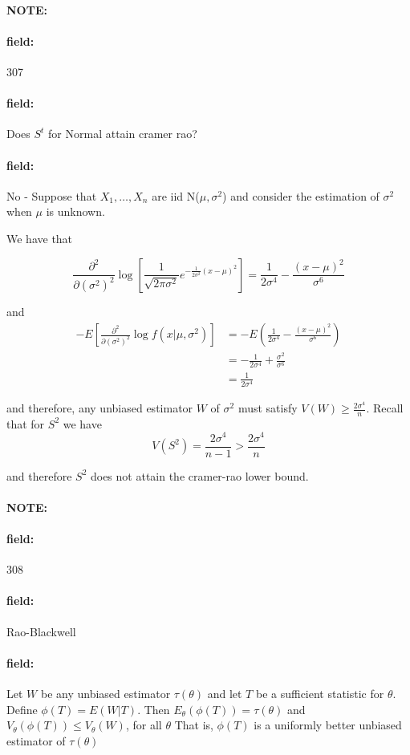 \documentclass[12pt]{article}
\newenvironment{note}{\paragraph{NOTE:}}{}
\newenvironment{field}{\paragraph{field:}}{}
\begin{document}
\begin{note} \begin{field} \tiny 307 \end{field}
  \begin{field}
    Does $S^t$ for Normal attain cramer rao?
  \end{field}
  \begin{field}
    No -
    Suppose that $X_1, \ldots , X_n$ are iid N($\mu,\sigma^2$)
    and consider the estimation of $\sigma^2$ when $\mu$ is unknown.

    We have that

    $$ \frac{\partial ^2 }{\partial (\sigma^2) ^2} \log [ \frac{1}{\sqrt{2\pi\sigma^2}} e^{-\frac{1}{2\sigma^2}(x-\mu)^2}] = \frac{1}{2\sigma^4} - \frac{(x-\mu)^2}{\sigma^6}$$

    and
    \begin{align*}
      -E[\frac{\partial ^2 }{\partial (\sigma^2)^2 } \log f(x|\mu,\sigma^2)] &= -E(\frac{1}{2\sigma^4} - \frac{(x-\mu)^2}{\sigma^6})\\
      &= -\frac{1}{2\sigma^4} + \frac{\sigma^2}{\sigma^6}\\
      &= \frac{1}{2\sigma^4}
    \end{align*}

    and therefore, any unbiased estimator $W$ of $\sigma^2$ must satisfy $V(W) \geq \frac{2\sigma^4}{n}$. Recall that for $S^2$ we have $$V(S^2) = \frac{2\sigma^4}{n-1} > \frac{2\sigma^4}{n}$$

    and therefore $S^2$ does not attain the cramer-rao lower bound.

  \end{field}
\end{note}

\begin{note} \begin{field} \tiny 308 \end{field}
  \begin{field}
    Rao-Blackwell
  \end{field}
  \begin{field}
    Let $W$ be any unbiased estimator $\tau(\theta)$ and let $T$ be a sufficient statistic for $\theta$. Define $\phi(T) = E(W|T)$. Then $E_\theta(\phi(T)) = \tau(\theta)$ and $V_\theta(\phi(T))\leq V_\theta(W)$, for all $\theta$
    That is, $\phi(T)$ is a uniformly better unbiased estimator of $\tau(\theta)$
  \end{field}
\end{note}
\end{document}
